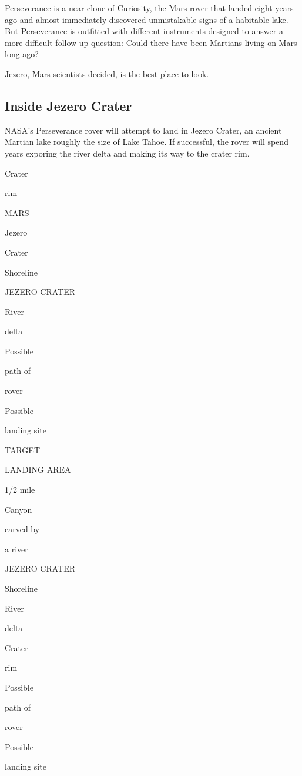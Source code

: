 Perseverance is a near clone of Curiosity, the Mars rover that landed
eight years ago and almost immediately discovered unmistakable signs of
a habitable lake. But Perseverance is outfitted with different
instruments designed to answer a more difficult follow-up question:
\href{https://www.nytimes.com/2020/07/24/science/mars-life-water.html}{Could
there have been Martians living on Mars long ago}?

Jezero, Mars scientists decided, is the best place to look.

\hypertarget{inside-jezero-crater}{%
\subsection{Inside Jezero Crater}\label{inside-jezero-crater}}

NASA's Perseverance rover will attempt to land in Jezero Crater, an
ancient Martian lake roughly the size of Lake Tahoe. If successful, the
rover will spend years exporing the river delta and making its way to
the crater rim.

Crater

rim

MARS

Jezero

Crater

Shoreline

JEZERO CRATER

River

delta

Possible

path of

rover

Possible

landing site

TARGET

LANDING AREA

1/2 mile

Canyon

carved by

a river

JEZERO CRATER

Shoreline

River

delta

Crater

rim

Possible

path of

rover

Possible

landing site

